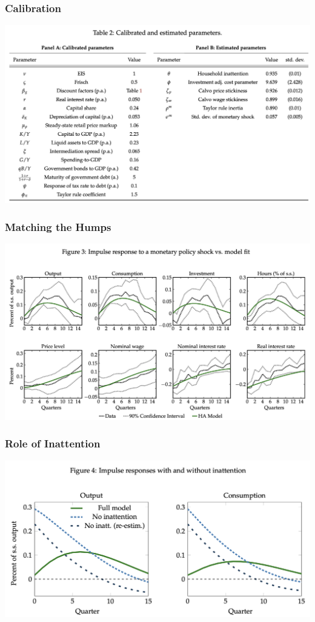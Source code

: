 \documentclass[english,xcolor=svgnames]{beamer}
\begin{document}
\begin{frame}
    \frametitle{Calibration}
    \begin{center}
    	\includegraphics[scale=0.25]{figures/ARSTAB2.png}	
    \end{center}
\end{frame}


\begin{frame}
    \frametitle{Matching the Humps}
    \begin{center}
    	\includegraphics[scale=0.25]{figures/ARSFIG3.png}	
    \end{center}
\end{frame}

\begin{frame}
    \frametitle{Role of Inattention}
    \begin{center}
    	\includegraphics[scale=0.3]{figures/ARSFIG4.png}	
    \end{center}
\end{frame}
\end{document}
